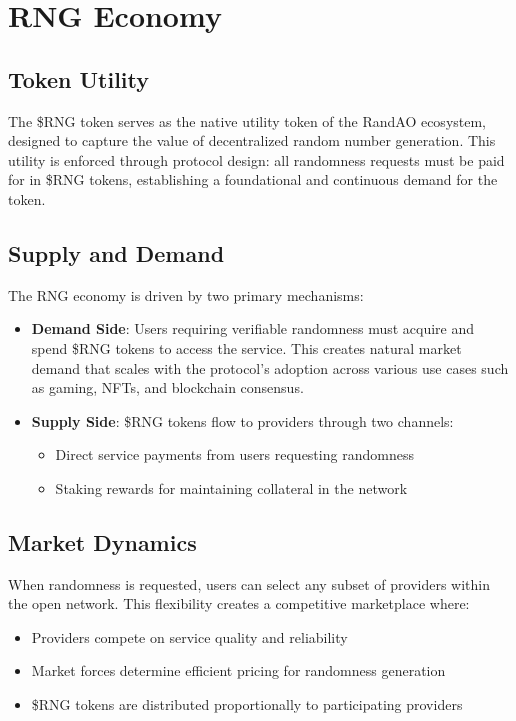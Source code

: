 \section{RNG Economy}\label{sec:rng_economics}

\subsection{Token Utility}\label{sec:token_utility}
The \$RNG token serves as the native utility token of the RandAO ecosystem, designed to capture the value of decentralized random number generation. This utility is enforced through protocol design: all randomness requests must be paid for in \$RNG tokens, establishing a foundational and continuous demand for the token.

\subsection{Supply and Demand}\label{sec:supply_demand}
The RNG economy is driven by two primary mechanisms:

\begin{itemize}
    \item \textbf{Demand Side}: Users requiring verifiable randomness must acquire and spend \$RNG tokens to access the service. This creates natural market demand that scales with the protocol's adoption across various use cases such as gaming, NFTs, and blockchain consensus.
    
    \item \textbf{Supply Side}: \$RNG tokens flow to providers through two channels:
    \begin{itemize}
        \item Direct service payments from users requesting randomness
        \item Staking rewards for maintaining collateral in the network
    \end{itemize}
\end{itemize}

\subsection{Market Dynamics}\label{sec:market_dynamics}
When randomness is requested, users can select any subset of providers within the open network. This flexibility creates a competitive marketplace where:

\begin{itemize}
    \item Providers compete on service quality and reliability
    \item Market forces determine efficient pricing for randomness generation
    \item \$RNG tokens are distributed proportionally to participating providers
\end{itemize}

